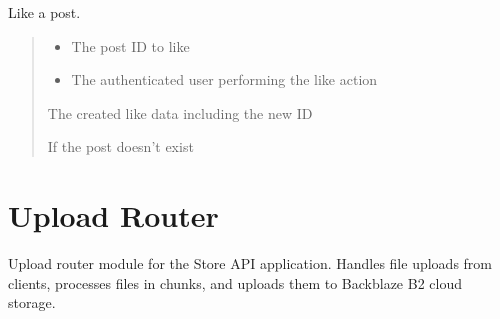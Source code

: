 \documentclass[letterpaper,10pt,openany,oneside,english]{sphinxmanual}
\begin{document}

\begin{savenotes}\begin{fulllineitems}
\label{\detokenize{modules/routers:storeapi.routers.post.like_post}}
\pysigstartsignatures
{}
\pysigstopsignatures
\sphinxAtStartPar
Like a post.
\begin{quote}\begin{description}
\begin{itemize}
\item {} 
\sphinxAtStartPar
{} \textendash{} The post ID to like

\item {} 
\sphinxAtStartPar
{} \textendash{} The authenticated user performing the like action

\end{itemize}

\sphinxAtStartPar
The created like data including the new ID

\sphinxAtStartPar
{} \textendash{} If the post doesn’t exist

\end{description}\end{quote}

\end{fulllineitems}\end{savenotes}



\section{Upload Router}
\label{\detokenize{modules/routers:module-storeapi.routers.upload}}\label{\detokenize{modules/routers:upload-router}}
\sphinxAtStartPar
Upload router module for the Store API application.
Handles file uploads from clients, processes files in chunks,
and uploads them to Backblaze B2 cloud storage.
\end{document}
